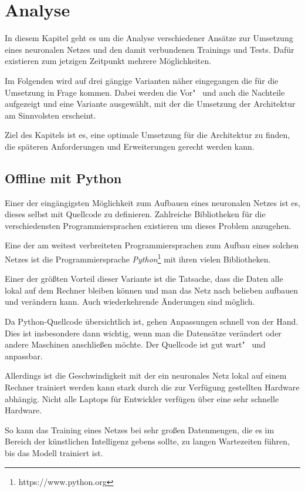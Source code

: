 \section{Analyse}
\label{sec:analyse}
In diesem Kapitel geht es um die Analyse verschiedener Ansätze zur Umsetzung eines neuronalen Netzes und den damit
verbundenen Trainings und Tests. Dafür existieren zum jetzigen Zeitpunkt mehrere Möglichkeiten.

Im Folgenden wird auf drei gängige Varianten näher eingegangen die für die Umsetzung in Frage kommen. Dabei werden die
Vor"~ und auch die Nachteile aufgezeigt und eine Variante ausgewählt, mit der die Umsetzung der Architektur am
Sinnvolsten erscheint.

Ziel des Kapitels ist es, eine optimale Umsetzung für die Architektur zu finden, die späteren Anforderungen und
Erweiterungen gerecht werden kann.

\subsection{Offline mit Python}
Einer der eingängigsten Möglichkeit zum Aufbauen eines neuronalen Netzes ist es, dieses selbst mit Quellcode zu
definieren. Zahlreiche Bibliotheken für die verschiedensten Programmiersprachen existieren um dieses Problem anzugehen.

Eine der am weitest verbreiteten Programmiersprachen zum Aufbau eines solchen Netzes ist die Programmiersprache
\textit{Python}\footnote{https://www.python.org} mit ihren vielen Bibliotheken.

Einer der größten Vorteil dieser Variante ist die Tatsache, dass die Daten alle lokal auf dem Rechner bleiben können und
man das Netz nach belieben aufbauen und verändern kann. Auch wiederkehrende Änderungen sind möglich.

Da Python-Quellcode übersichtlich ist, gehen Anpassungen schnell von der Hand. Dies ist insbesondere dann wichtig, wenn
man die Datensätze verändert oder andere Maschinen anschließen möchte. Der Quellcode ist gut wart"~ und anpassbar.

Allerdings ist die Geschwindigkeit mit der ein neuronales Netz lokal auf einem Rechner trainiert werden kann stark durch
die zur Verfügung gestellten Hardware abhängig. Nicht alle Laptops für Entwickler verfügen über eine sehr schnelle
Hardware.

So kann das Training eines Netzes bei sehr großen Datenmengen, die es im Bereich der künstlichen Intelligenz gebens
sollte, zu langen Wartezeiten führen, bis das Modell trainiert ist.

